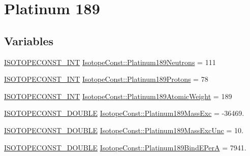 \hypertarget{group___isotope_const-_platinum-_pt189}{}\section{Platinum 189}
\label{group___isotope_const-_platinum-_pt189}
\subsection*{Variables}
\begin{DoxyCompactItemize}
\item 
\mbox{\hyperlink{group___isotope_const-_macros_ga5f18360b3e99483a35c32d789e62621c}{I\+S\+O\+T\+O\+P\+E\+C\+O\+N\+S\+T\+\_\+\+I\+NT}} \mbox{\hyperlink{group___isotope_const-_platinum-_pt189_ga9507f31bebca88f6e1959e8a75004a97}{Isotope\+Const\+::\+Platinum189\+Neutrons}} = 111
\item 
\mbox{\hyperlink{group___isotope_const-_macros_ga5f18360b3e99483a35c32d789e62621c}{I\+S\+O\+T\+O\+P\+E\+C\+O\+N\+S\+T\+\_\+\+I\+NT}} \mbox{\hyperlink{group___isotope_const-_platinum-_pt189_gaa0b6ca5a363b9dccfecc9752b24f0b17}{Isotope\+Const\+::\+Platinum189\+Protons}} = 78
\item 
\mbox{\hyperlink{group___isotope_const-_macros_ga5f18360b3e99483a35c32d789e62621c}{I\+S\+O\+T\+O\+P\+E\+C\+O\+N\+S\+T\+\_\+\+I\+NT}} \mbox{\hyperlink{group___isotope_const-_platinum-_pt189_gabb70fc0bd92db1b94cb03d705f8cf545}{Isotope\+Const\+::\+Platinum189\+Atomic\+Weight}} = 189
\item 
\mbox{\hyperlink{group___isotope_const-_macros_ga8f45a7272ce02c0b4c65c44636ed719a}{I\+S\+O\+T\+O\+P\+E\+C\+O\+N\+S\+T\+\_\+\+D\+O\+U\+B\+LE}} \mbox{\hyperlink{group___isotope_const-_platinum-_pt189_ga90d3863a005446d47f08765bd2794f2f}{Isotope\+Const\+::\+Platinum189\+Mass\+Exc}} = -\/36469.
\item 
\mbox{\hyperlink{group___isotope_const-_macros_ga8f45a7272ce02c0b4c65c44636ed719a}{I\+S\+O\+T\+O\+P\+E\+C\+O\+N\+S\+T\+\_\+\+D\+O\+U\+B\+LE}} \mbox{\hyperlink{group___isotope_const-_platinum-_pt189_ga17a044d0134a269d637919513f9525e9}{Isotope\+Const\+::\+Platinum189\+Mass\+Exc\+Unc}} = 10.
\item 
\mbox{\hyperlink{group___isotope_const-_macros_ga8f45a7272ce02c0b4c65c44636ed719a}{I\+S\+O\+T\+O\+P\+E\+C\+O\+N\+S\+T\+\_\+\+D\+O\+U\+B\+LE}} \mbox{\hyperlink{group___isotope_const-_platinum-_pt189_ga79a87f385364a7cf77c7b553c6fd36f4}{Isotope\+Const\+::\+Platinum189\+Bind\+E\+PerA}} = 7941.
\item 

\end{DoxyCompactItemize}
